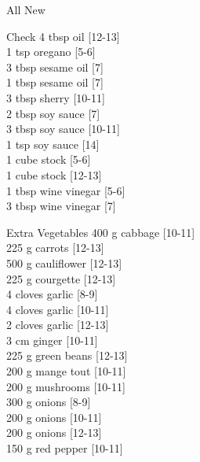 \begin{menu}{All New}
\begin{shoppinglist}{Check}
      4 tbsp oil 
        {\scriptsize[12-13]}\\
      1 tsp oregano 
        {\scriptsize[5-6]}\\
      3 tbsp sesame oil 
        {\scriptsize[7]}\\
      1 tbsp sesame oil 
        {\scriptsize[7]}\\
      3 tbsp sherry 
        {\scriptsize[10-11]}\\
      2 tbsp soy sauce 
        {\scriptsize[7]}\\
      3 tbsp soy sauce 
        {\scriptsize[10-11]}\\
      1 tsp soy sauce 
        {\scriptsize[14]}\\
      1 cube stock 
        {\scriptsize[5-6]}\\
      1 cube stock 
        {\scriptsize[12-13]}\\
      1 tbsp wine vinegar 
        {\scriptsize[5-6]}\\
      3 tbsp wine vinegar 
        {\scriptsize[7]}\\
      \end{shoppinglist}%
      \begin{shoppinglist}{Extra Vegetables}
      400 g cabbage 
        {\scriptsize[10-11]}\\
      225 g carrots 
        {\scriptsize[12-13]}\\
      500 g cauliflower 
        {\scriptsize[12-13]}\\
      225 g courgette 
        {\scriptsize[12-13]}\\
      4 cloves garlic 
        {\scriptsize[8-9]}\\
      4 cloves garlic 
        {\scriptsize[10-11]}\\
      2 cloves garlic 
        {\scriptsize[12-13]}\\
      3 cm ginger 
        {\scriptsize[10-11]}\\
      225 g green beans 
        {\scriptsize[12-13]}\\
      200 g mange tout 
        {\scriptsize[10-11]}\\
      200 g mushrooms 
        {\scriptsize[10-11]}\\
      300 g onions 
        {\scriptsize[8-9]}\\
      200 g onions 
        {\scriptsize[10-11]}\\
      200 g onions 
        {\scriptsize[12-13]}\\
      150 g red pepper 
        {\scriptsize[10-11]}\\
      \end{shoppinglist}%
      \par\vfil %
    \vfil\clearpage
  

\end{menu}
